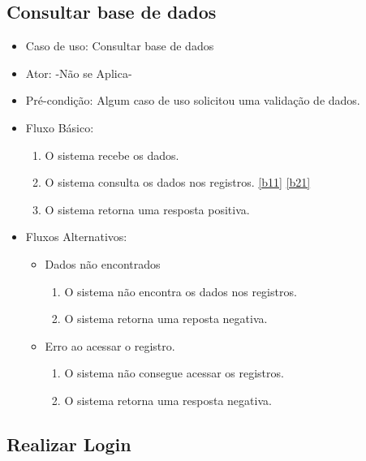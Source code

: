 \documentclass{utfpr-pg}
\begin{document}
     \subsection{Consultar base de dados} \label{consultadorbanco}
        \begin{itemize}
        \item Caso de uso: Consultar base de dados
        \item Ator: -Não se Aplica-
        \item Pré-condição: Algum caso de uso solicitou uma validação de dados.
        \item Fluxo Básico:
            \begin{enumerate}[label=\textbf{\arabic*}]
                \item O sistema recebe os dados.
                \item O sistema consulta os dados nos registros. \ref{b11} \ref{b21}
                \item O sistema retorna uma resposta positiva.
            \end{enumerate}
        \item Fluxos Alternativos:
            \begin{itemize}
            \item Dados não encontrados 
            \begin{enumerate}[label=\textbf{2.1.\arabic*}]
                \item \label{b11} O sistema não encontra os dados nos registros.
                \item O sistema retorna uma reposta negativa.
            \end{enumerate}
            
            \item Erro ao acessar o registro.
            \begin{enumerate}[label=\textbf{2.2.\arabic*}]
                \item \label{b21} O sistema não consegue acessar os registros.
                \item O sistema retorna uma resposta negativa.
            \end{enumerate}
        \end{itemize}
        \end{itemize}
        
        
    \subsection{Realizar Login}
    
\end{document}
